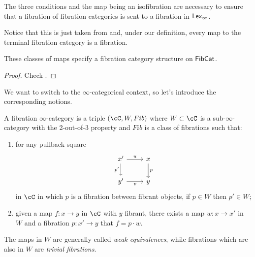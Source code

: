 \documentclass[a4paper,12pt]{scrartcl}
\begin{document}
The three conditions and the map being an isofibration are necessary to ensure
that a fibration of fibration categories is sent to a fibration in $\operatorname{\mathsf{Lex}_\infty}$.

Notice that this is just taken from \cite[Def.\ 4.3]{KS19} and, under our
definition, every map to the terminal fibration category is a fibration.

\begin{prop}
  These classes of maps specify a fibration category structure on $\operatorname{\mathsf{FibCat}}$.
\end{prop}
\begin{proof}
  Check \cite{KS19}.
\end{proof}

We want to switch to the $\infty$-categorical context, so let's introduce the
corresponding notions.

\begin{defn}
  A fibration $\infty$-category is a triple $(\cC,W,Fib)$ where $W\subset\cC$
  is a sub-$\infty$-category with the 2-out-of-3 property and $Fib$ is a class
  of fibrations such that:
  \begin{enumerate}
    \item for any pullback square
      \[\begin{tikzcd}
        {x'} & x \\
        {y'} & y
        \arrow["p", from=1-2, to=2-2]
        \arrow["{p'}"', from=1-1, to=2-1]
        \arrow["v"', from=2-1, to=2-2]
        \arrow["u", from=1-1, to=1-2]
      \end{tikzcd}\]
      in $\cC$ in which $p$ is a fibration between fibrant objects, if $p\in W$
      then $p'\in W$;
    \item given a map $f\colon x\rightarrow y$ in $\cC$ with $y$ fibrant, there
      exists a map $w\colon x\rightarrow x'$ in $W$ and a fibration $p\colon
      x'\rightarrow y$ that $f=p\cdot w$.
  \end{enumerate}
  The maps in $W$ are generally called \emph{weak equivalences}, while
  fibrations which are also in $W$ are \emph{trivial fibrations}.
\end{defn}
\end{document}
